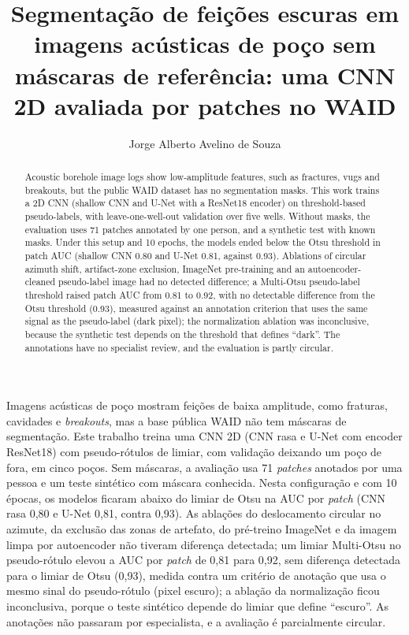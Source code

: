 \documentclass[12pt]{article}
\title{Segmentação de feições escuras em imagens acústicas de poço sem máscaras de referência: uma CNN 2D avaliada por patches no WAID}
\author{Jorge Alberto Avelino de Souza\inst{1}}
\begin{document}
\maketitle

\begin{abstract}
  Acoustic borehole image logs show low-amplitude features, such as fractures, vugs and breakouts, but the public WAID dataset has no segmentation masks. This work trains a 2D CNN (shallow CNN and U-Net with a ResNet18 encoder) on threshold-based pseudo-labels, with leave-one-well-out validation over five wells. Without masks, the evaluation uses 71 patches annotated by one person, and a synthetic test with known masks. Under this setup and 10 epochs, the models ended below the Otsu threshold in patch AUC (shallow CNN 0.80 and U-Net 0.81, against 0.93). Ablations of circular azimuth shift, artifact-zone exclusion, ImageNet pre-training and an autoencoder-cleaned pseudo-label image had no detected difference; a Multi-Otsu pseudo-label threshold raised patch AUC from 0.81 to 0.92, with no detectable difference from the Otsu threshold (0.93), measured against an annotation criterion that uses the same signal as the pseudo-label (dark pixel); the normalization ablation was inconclusive, because the synthetic test depends on the threshold that defines ``dark''. The annotations have no specialist review, and the evaluation is partly circular.
\end{abstract}

\begin{resumo}
  Imagens acústicas de poço mostram feições de baixa amplitude, como fraturas, cavidades e \textit{breakouts}, mas a base pública WAID não tem máscaras de segmentação. Este trabalho treina uma CNN 2D (CNN rasa e U-Net com encoder ResNet18) com pseudo-rótulos de limiar, com validação deixando um poço de fora, em cinco poços. Sem máscaras, a avaliação usa 71 \textit{patches} anotados por uma pessoa e um teste sintético com máscara conhecida. Nesta configuração e com 10 épocas, os modelos ficaram abaixo do limiar de Otsu na AUC por \textit{patch} (CNN rasa 0,80 e U-Net 0,81, contra 0,93). As ablações do deslocamento circular no azimute, da exclusão das zonas de artefato, do pré-treino ImageNet e da imagem limpa por autoencoder não tiveram diferença detectada; um limiar Multi-Otsu no pseudo-rótulo elevou a AUC por \textit{patch} de 0,81 para 0,92, sem diferença detectada para o limiar de Otsu (0,93), medida contra um critério de anotação que usa o mesmo sinal do pseudo-rótulo (pixel escuro); a ablação da normalização ficou inconclusiva, porque o teste sintético depende do limiar que define ``escuro''. As anotações não passaram por especialista, e a avaliação é parcialmente circular.
\end{resumo}
\end{document}
